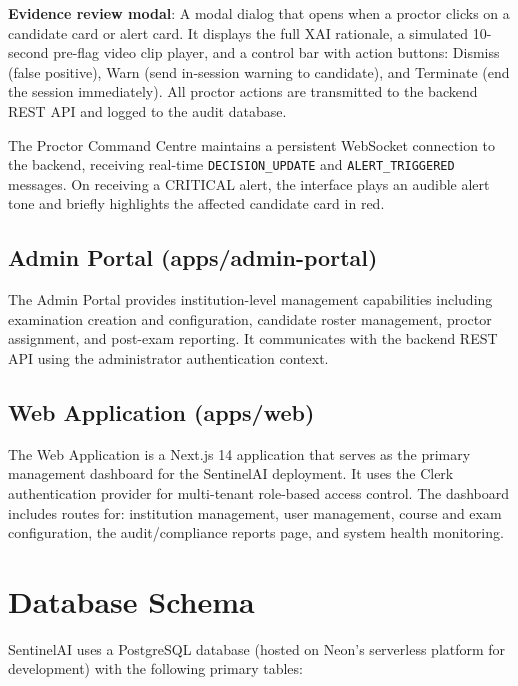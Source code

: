 \textbf{Evidence review modal}: A modal dialog that opens when a proctor clicks on a candidate card or alert card. It displays the full XAI rationale, a simulated 10-second pre-flag video clip player, and a control bar with action buttons: Dismiss (false positive), Warn (send in-session warning to candidate), and Terminate (end the session immediately). All proctor actions are transmitted to the backend REST API and logged to the audit database.

The Proctor Command Centre maintains a persistent WebSocket connection to the backend, receiving real-time \texttt{DECISION\_UPDATE} and \texttt{ALERT\_TRIGGERED} messages. On receiving a CRITICAL alert, the interface plays an audible alert tone and briefly highlights the affected candidate card in red.

\subsection{Admin Portal (apps/admin-portal)}

The Admin Portal provides institution-level management capabilities including examination creation and configuration, candidate roster management, proctor assignment, and post-exam reporting. It communicates with the backend REST API using the administrator authentication context.

\subsection{Web Application (apps/web)}

The Web Application is a Next.js 14 application that serves as the primary management dashboard for the SentinelAI deployment. It uses the Clerk authentication provider for multi-tenant role-based access control. The dashboard includes routes for: institution management, user management, course and exam configuration, the audit/compliance reports page, and system health monitoring.

\section{Database Schema}

SentinelAI uses a PostgreSQL database (hosted on Neon's serverless platform for development) with the following primary tables:

